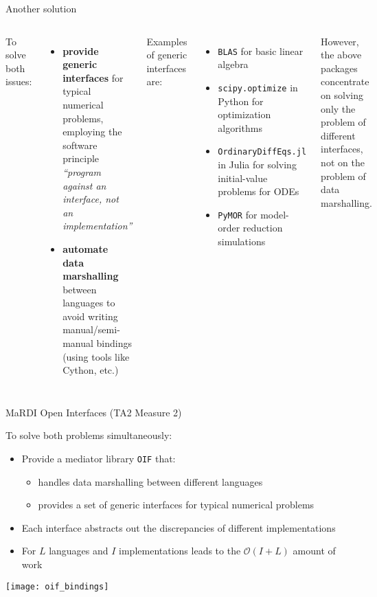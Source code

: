 \documentclass[
  10pt,
  aspectratio=169,
  english,
]{beamer}
\begin{document}
\begin{frame}[label=current]{Another solution}
  \begin{columns}[t]
    To solve both issues:
    \begin{itemize}
      \item \textbf{provide generic interfaces} for typical numerical problems,
            employing the software principle
            \emph{``program against an interface, not an implementation''}
      \item \textbf{automate data marshalling} between languages
            to avoid writing manual/semi-manual bindings
            (using tools like Cython, etc.)
    \end{itemize}

    Examples of generic interfaces are:
    \begin{itemize}
      \item \texttt{BLAS} for basic linear algebra
      \item \texttt{scipy.optimize} in Python for optimization algorithms
      \item \texttt{OrdinaryDiffEqs.jl} in Julia for solving initial-value problems for ODEs
      \item \texttt{PyMOR} for model-order reduction simulations
    \end{itemize}

    However, the above packages concentrate on solving only
    the problem of different interfaces, not on the problem
    of data marshalling.
  \end{columns}
\end{frame}

\begin{frame}{MaRDI Open Interfaces (TA2 Measure 2)}
  \begin{minipage}{0.45\textwidth}
    To solve both problems simultaneously:
    \begin{itemize}
      \item Provide a mediator library \texttt{OIF} that:
            \begin{itemize}
              \item handles data marshalling between different languages
              \item provides a set of generic interfaces
                    for typical numerical problems
            \end{itemize}
      \item Each interface abstracts out the discrepancies
            of different implementations
      \item For $L$ languages and $I$ implementations leads to
            the $\mathcal O (I + L)$ amount of work
    \end{itemize}
  \end{minipage}\hfill%
  \begin{minipage}{0.50\textwidth}
    \centering
    \texttt{[image: oif\_bindings]}
  \end{minipage}
\end{frame}
\end{document}
